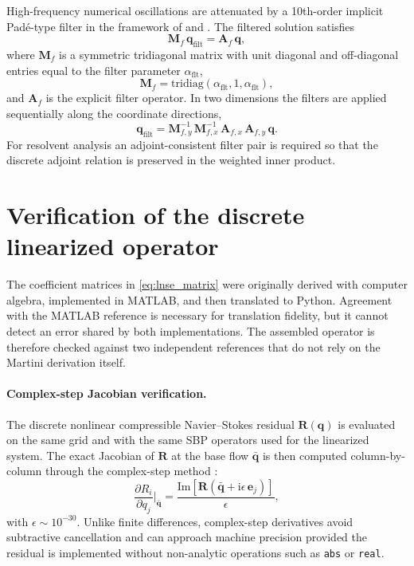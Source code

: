 \documentclass[11pt]{article}
\newcommand{\pp}{\partial}
\newcommand{\bq}{\mathbf{q}}
\newcommand{\bqbar}{\bar{\mathbf{q}}}
\newcommand{\bA}{\mathbf{A}}
\newcommand{\bM}{\mathbf{M}}
\newcommand{\bR}{\mathbf{R}}
\begin{document}
High-frequency numerical oscillations are attenuated by a 10th-order implicit
Pad\'e-type filter in the framework of \citet{lele1992compact} and
\citet{visbal2002use}. The filtered solution satisfies
\begin{equation}
  \bM_f\,\bq_{\mathrm{filt}} = \bA_f\,\bq,
  \label{eq:filter_implicit}
\end{equation}
where $\bM_f$ is a symmetric tridiagonal matrix with unit diagonal and
off-diagonal entries equal to the filter parameter $\alpha_{\mathrm{flt}}$,
\begin{equation}
  \bM_f = \mathrm{tridiag}(\alpha_{\mathrm{flt}},1,\alpha_{\mathrm{flt}}),
  \label{eq:filter_Mf}
\end{equation}
and $\bA_f$ is the explicit filter operator. In two dimensions the filters are
applied sequentially along the coordinate directions,
\begin{equation}
  \bq_{\mathrm{filt}}
  = \bM_{f,y}^{-1}\,\bM_{f,x}^{-1}\,\bA_{f,x}\,\bA_{f,y}\,\bq.
  \label{eq:filter_2d}
\end{equation}
For resolvent analysis an adjoint-consistent filter pair is required so that
the discrete adjoint relation is preserved in the weighted inner product.

\section{Verification of the discrete linearized operator}
\label{sec:linearization_verification}

The coefficient matrices in \eqref{eq:lnse_matrix} were originally derived with
computer algebra, implemented in MATLAB, and then translated to Python.
Agreement with the MATLAB reference is necessary for translation fidelity, but
it cannot detect an error shared by both implementations. The assembled
operator is therefore checked against two independent references that do not
rely on the Martini derivation itself.

\paragraph{Complex-step Jacobian verification.}
The discrete nonlinear compressible Navier--Stokes residual $\bR(\bq)$ is
evaluated on the same grid and with the same SBP operators used for the
linearized system. The exact Jacobian of $\bR$ at the base flow $\bqbar$ is
then computed column-by-column through the complex-step method
\citep{squire1998using,martins2003complex}:
\begin{equation}
  \frac{\pp R_i}{\pp q_j}\bigg|_{\bqbar}
  = \frac{\mathrm{Im}\!\left[\bR(\bqbar + \mathrm{i}\epsilon\,\mathbf{e}_j)\right]}
         {\epsilon},
  \label{eq:complex_step}
\end{equation}
with $\epsilon \sim 10^{-30}$. Unlike finite differences, complex-step
derivatives avoid subtractive cancellation and can approach machine precision
provided the residual is implemented without non-analytic operations such as
\texttt{abs} or \texttt{real}.
\end{document}
